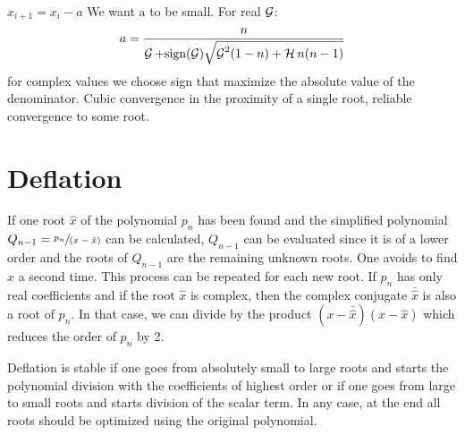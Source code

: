 $x_{i+1}=x_i -a$ We want a to be small.
For real $\operatorname{\mathcal{G}}$:
\begin{equation*}
    a = \frac{n}{\operatorname{\mathcal{G}} + \text{sign}(\operatorname{\mathcal{G}}) \sqrt {\operatorname{\mathcal{G}}^2(1-n)+ \operatorname{\mathcal{H}} n(n-1)}}
\end{equation*}
for complex values we choose sign that maximize the absolute value of the denominator.
\textrightarrow{} Cubic convergence in the proximity of a single root, reliable convergence to some root.

\section{Deflation}\label{sec:deflation}
If one root $\hat{x}$ of the polynomial $p_n$ has been found and the simplified polynomial
$Q_{n-1}= \sfrac{p_n}{(x-\hat{x})}$ can be calculated,
$Q_{n-1}$ can be evaluated since it is of a lower order and the roots of $Q_{n-1}$ are the remaining unknown roots.
One avoids to find $\hat{x}$ a second time.
This process can be repeated for each new root.
If $p_n$ has only real coefficients and if the root $\hat{x}$ is complex, then the complex
conjugate  $\bar{\hat{x}}$ is also a root of $p_n$.
In that case, we can divide by the product $(x-\bar{\hat{x}})(x-\hat{x})$ which
reduces the order of $p_n$ by 2.

Deflation is stable if one goes from absolutely small to large roots and starts
the polynomial division with the coefficients of highest order or if one goes
from large to small roots and starts division of the scalar term.
In any case, at the end all roots should be optimized using the original polynomial.

